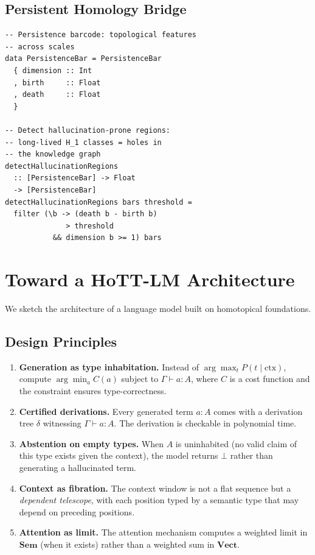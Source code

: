 \documentclass[11pt,a4paper,twocolumn]{article}
\theoremstyle{plain}
\theoremstyle{definition}
\newcommand{\Sem}{\mathbf{Sem}}
\newcommand{\Vect}{\mathbf{Vect}}
\begin{document}
\subsection{Persistent Homology Bridge}

\begin{lstlisting}
-- Persistence barcode: topological features
-- across scales
data PersistenceBar = PersistenceBar
  { dimension :: Int
  , birth     :: Float
  , death     :: Float
  }

-- Detect hallucination-prone regions:
-- long-lived H_1 classes = holes in
-- the knowledge graph
detectHallucinationRegions
  :: [PersistenceBar] -> Float
  -> [PersistenceBar]
detectHallucinationRegions bars threshold =
  filter (\b -> (death b - birth b)
              > threshold
           && dimension b >= 1) bars
\end{lstlisting}

\section{Toward a HoTT-LM Architecture}\label{sec:architecture}

We sketch the architecture of a language model built on homotopical foundations.

\subsection{Design Principles}

\begin{enumerate}[leftmargin=*,nosep]
  \item \textbf{Generation as type inhabitation.} Instead of $\arg\max_t P(t \mid \text{ctx})$, compute $\arg\min_a C(a)$ subject to $\Gamma \vdash a : A$, where $C$ is a cost function and the constraint ensures type-correctness.
  \item \textbf{Certified derivations.} Every generated term $a : A$ comes with a derivation tree $\delta$ witnessing $\Gamma \vdash a : A$. The derivation is checkable in polynomial time.
  \item \textbf{Abstention on empty types.} When $A$ is uninhabited (no valid claim of this type exists given the context), the model returns $\bot$ rather than generating a hallucinated term.
  \item \textbf{Context as fibration.} The context window is not a flat sequence but a \emph{dependent telescope}, with each position typed by a semantic type that may depend on preceding positions.
  \item \textbf{Attention as limit.} The attention mechanism computes a weighted limit in $\Sem$ (when it exists) rather than a weighted sum in $\Vect$.
\end{enumerate}
\end{document}
